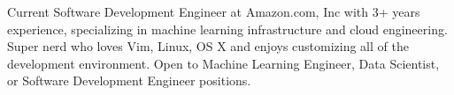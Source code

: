 \begin{cvparagraph}

Current Software Development Engineer at Amazon.com, Inc with 3+ years experience, specializing in machine learning infrastructure and cloud engineering. Super nerd who loves Vim, Linux, OS X and enjoys customizing all of the development environment. Open to Machine Learning Engineer, Data Scientist, or Software Development Engineer positions.
\end{cvparagraph}

